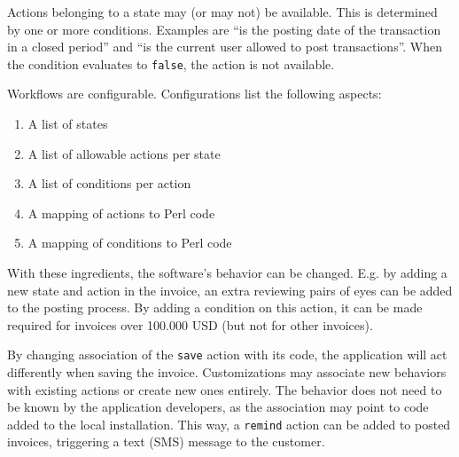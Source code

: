
Actions belonging to a state may (or may not) be available. This is determined by one or
more conditions.  Examples are ``is the posting date of the transaction in a closed period''
and ``is the current user allowed to post transactions''.  When the condition evaluates to
\texttt{false}, the action is not available.

Workflows are configurable. Configurations list the following aspects:

\begin{enumerate}
	\item A list of states
	\item A list of allowable actions per state
	\item A list of conditions per action
	\item A mapping of actions to Perl code
	\item A mapping of conditions to Perl code
\end{enumerate}

With these ingredients, the software's behavior can be changed.  E.g. by adding a new state
and action in the invoice, an extra reviewing pairs of eyes can be added to the posting process.
By adding a condition on this action, it can be made required for invoices over 100.000 USD
(but not for other invoices).


By changing association of the \texttt{save} action with its code, the application will act
differently when saving the invoice.  Customizations may associate new behaviors with existing
actions or create new ones entirely.  The behavior does not need to be known by the application
developers, as the association may point to code added to the local installation.  This way, a
\texttt{remind} action can be added to posted invoices, triggering a text (SMS) message to the
customer.


